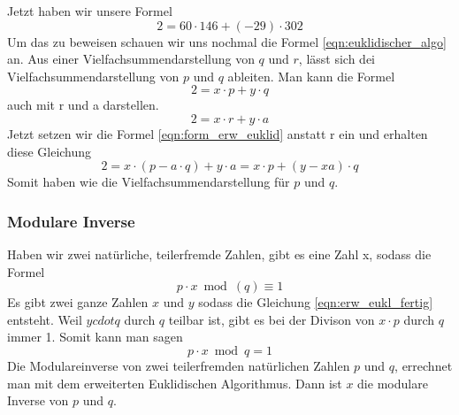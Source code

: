 %
Jetzt haben wir unsere Formel
%
\begin{equation}
 2 = 60 \cdot 146 + (-29) \cdot 302
\end{equation}
%
Um das zu beweisen schauen wir uns nochmal die Formel \ref{eqn:euklidischer_algo} an. Aus einer Vielfachsummendarstellung von $q$ und $r$, lässt sich dei Vielfachsummendarstellung von $p$ und $q$ ableiten. Man kann die Formel
\begin{equation*}
  2 = x \cdot p + y \cdot q
  \label{eqn:erw_eukl_fertig}
\end{equation*}
%
auch mit r und a darstellen.
%
\begin{equation*}
  2 = x \cdot r + y \cdot a
\end{equation*}
%
Jetzt setzen wir die Formel \ref{eqn:form_erw_euklid} anstatt r ein und erhalten diese Gleichung
\begin{equation*}
  2 = x \cdot (p - a \cdot q)  + y \cdot a = x \cdot p + (y - xa) \cdot q
\end{equation*}
%
Somit haben wie die Vielfachsummendarstellung für $p$ und $q$.
%
\subsubsection{Modulare Inverse}
Haben wir zwei natürliche, teilerfremde Zahlen, gibt es eine Zahl x, sodass die Formel
%
\begin{equation*}
  p \cdot x \bmod(q) \equiv 1
\end{equation*}
%
Es gibt zwei ganze Zahlen $x$ und $y$ sodass die Gleichung \ref{eqn:erw_eukl_fertig} entsteht.
Weil $y cdot q$ durch $q$ teilbar ist, gibt es bei der Divison von $x \cdot p$ durch $q$ immer 1. Somit kann man sagen
%
\begin{equation}
  p \cdot x \bmod q = 1
  \label{eqn:mod_inverse}
\end{equation}
%
Die Modulareinverse von zwei teilerfremden natürlichen Zahlen $p$ und $q$, errechnet man mit dem erweiterten Euklidischen Algorithmus. Dann ist $x$ die modulare Inverse von $p$ und $q$.
